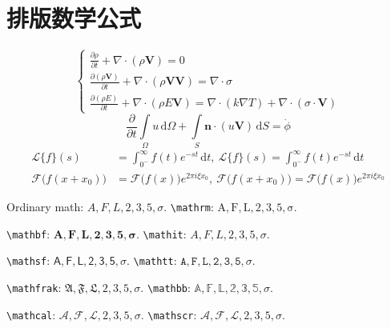 \documentclass[bachelor, comfort]{shtthesis}
\begin{document}
\section{排版数学公式}
\providecommand{\Vector}[1]{\ensuremath{\mathbf{ #1 }}}
\providecommand{\Tensor}[1]{\ensuremath{\mathbf{\mathsf{ #1 }}}}
\begin{equation}
  \begin{cases}
      \frac{\partial \rho}{\partial t} + \nabla\cdot(\rho\Vector{V}) = 0 \\
      \frac{\partial (\rho\Vector{V})}{\partial t} + \nabla\cdot(\rho\Vector{V}\Vector{V}) = \nabla\cdot\Tensor{\sigma} \\
      \frac{\partial (\rho E)}{\partial t} + \nabla\cdot(\rho E\Vector{V}) = \nabla\cdot(k\nabla T) + \nabla\cdot(\Tensor{\sigma}\cdot\Vector{V})
  \end{cases}
\end{equation}
\begin{equation}
  \frac{\partial }{\partial t}\int\limits_{\Omega} u \, \mathrm{d}\Omega + \int\limits_{S} \Vector{n}\cdot(u\Vector{V}) \, \mathrm{d}S = \dot{\phi}
\end{equation}
\[
  \begin{split}
      \mathcal{L} \{f\}(s) &= \int _{0^{-}}^{\infty} f(t) e^{-st} \, \mathrm{d}t, \ 
      \mathscr{L} \{f\}(s) = \int _{0^{-}}^{\infty} f(t) e^{-st} \, \mathrm{d}t\\
      \mathcal{F} {\bigl (} f(x+x_{0}) {\bigr )} &= \mathcal{F} {\bigl (} f(x) {\bigr )} e^{2\pi i\xi x_{0}}, \ 
      \mathscr{F} {\bigl (} f(x+x_{0}) {\bigr )} = \mathscr{F} {\bigl (} f(x) {\bigr )} e^{2\pi i\xi x_{0}}
  \end{split}
\]

Ordinary math: $A,F,L,2,3,5,\sigma$. \verb|\mathrm|: $\mathrm{A,F,L,2,3,5,\sigma}$.

\verb|\mathbf|: $\mathbf{A,F,L,2,3,5,\sigma}$. \verb|\mathit|: $\mathit{A,F,L,2,3,5,\sigma}$.

\verb|\mathsf|: $\mathsf{A,F,L,2,3,5,\sigma}$. \verb|\mathtt|: $\mathtt{A,F,L,2,3,5,\sigma}$.

\verb|\mathfrak|: $\mathfrak{A,F,L,2,3,5,\sigma}$. \verb|\mathbb|: $\mathbb{A,F,L,2,3,5,\sigma}$.

\verb|\mathcal|: $\mathcal{A,F,L,2,3,5,\sigma}$. \verb|\mathscr|: $\mathscr{A,F,L,2,3,5,\sigma}$.
\end{document}
